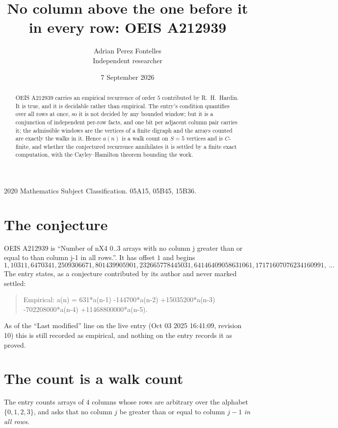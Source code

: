 \documentclass[11pt,a4paper]{article}
\title{No column above the one before it in every row: OEIS A212939}
\author{Adrian Perez Fontelles\\ \small Independent researcher}
\date{7 September 2026}
\theoremstyle{plain}
\theoremstyle{definition}
\begin{document}
\maketitle

\begin{abstract}
OEIS A212939 carries an empirical recurrence of order $5$ contributed by R.~H.~Hardin. It is
true, and it is decidable rather than empirical. The entry's condition quantifies over all rows at once, so it is not decided by any
bounded window; but it is a conjunction of independent per-row facts, and one bit per
adjacent column pair carries it; the
admissible windows are the vertices of a finite digraph and the arrays counted are exactly the
walks in it. Hence $a(n)$ is a walk count on $S=5$ vertices and is $C$-finite, and whether the
conjectured recurrence annihilates it is settled by a finite exact computation, with the
Cayley--Hamilton theorem bounding the work.
\end{abstract}

\noindent\small 2020 Mathematics Subject Classification. 05A15, 05B45, 15B36.\normalsize

\section{The conjecture}

OEIS A212939 is ``Number of nX4 0..3 arrays with no column j greater than or equal to than column j-1 in all rows.''. It has offset $1$ and begins
\[
1, 10311, 6470341, 2509306671, 801439905901, 232665778445031, 64146409058631061, 17171607076234160991,\ \dots
\]
The entry states, as a conjecture contributed by its author and never marked settled:
\begin{quote}
Empirical: a(n) = 631*a(n-1) -144700*a(n-2) +15035200*a(n-3) -702208000*a(n-4) +11468800000*a(n-5).
\end{quote}
As of the ``Last modified'' line on the live entry (Oct 03 2025 16:41:09, revision 10) this is still
recorded as empirical, and nothing on the entry records it as proved.

\section{The count is a walk count}

The entry counts arrays of $4$ columns whose rows are arbitrary over the alphabet $\{0,1,2,3\}$, and asks that no column $j$ be greater than or equal to column $j-1$ \emph{in all rows}.
\end{document}
